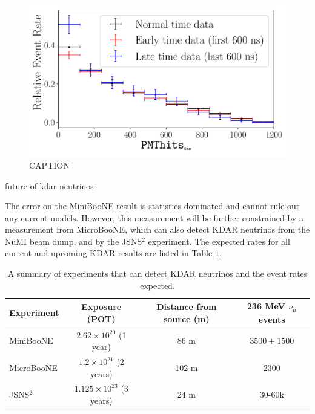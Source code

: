 \documentclass[
aps,
prl,
reprint,
showpacs,
]{revtex4-1}
\begin{document}
\begin{figure}[h]
\includegraphics[width=.95\linewidth]{img/observation} 
\caption{CAPTION}
\label{fig:obs}
\end{figure}



future of kdar neutrinos

The error on the MiniBooNE result is statistics dominated and cannot rule out any current models. However, this measurement will be further constrained by a measurement from MicroBooNE, which can also detect KDAR neutrinos from the NuMI beam dump, and by the JSNS$^2$ experiment. The expected rates for all current and upcoming KDAR results are listed in Table \ref{tab:exp}.

\begin{table}
  \label{tab:exp}
  \begin{ruledtabular}
  \newcommand{\twrw}[1]{\multirow{2}{*}{#1}}
  \begin{tabular}{lccc}
  Experiment & Exposure (POT) & Distance from source (m) & 236 MeV $\nu_\mu$ events \\
    \hline
MiniBooNE & $2.62\times 10^{20}$ (1 year) & 86 m& $3500\pm1500$ \\
MicroBooNE & $1.2\times 10^{21}$ (2 years) & 102 m & 2300 \\
JSNS$^2$ & $1.125\times 10^{23}$ (3 years) & 24 m  & 30-60k \\

  \end{tabular}
  \end{ruledtabular}
    \caption{A summary of experiments that can detect KDAR neutrinos and the event rates expected.}
\end{table}
\end{document}
